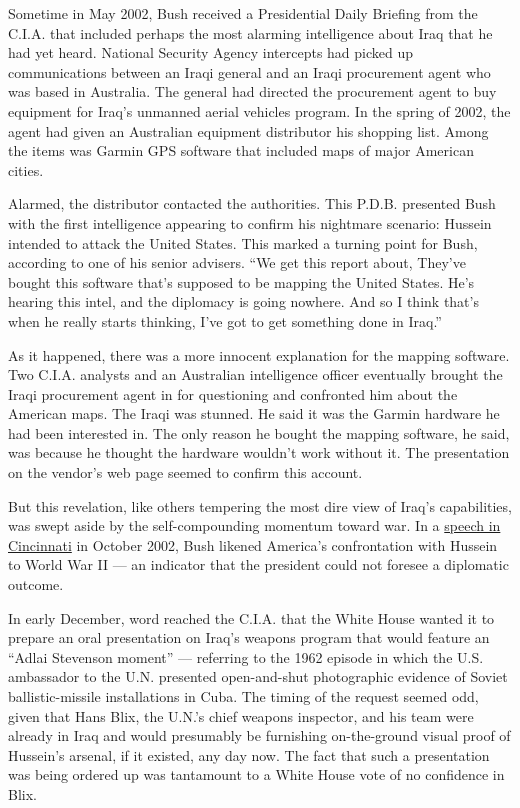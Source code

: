 Sometime in May 2002, Bush received a Presidential Daily Briefing from
the C.I.A. that included perhaps the most alarming intelligence about
Iraq that he had yet heard. National Security Agency intercepts had
picked up communications between an Iraqi general and an Iraqi
procurement agent who was based in Australia. The general had directed
the procurement agent to buy equipment for Iraq's unmanned aerial
vehicles program. In the spring of 2002, the agent had given an
Australian equipment distributor his shopping list. Among the items was
Garmin GPS software that included maps of major American cities.

Alarmed, the distributor contacted the authorities. This P.D.B.
presented Bush with the first intelligence appearing to confirm his
nightmare scenario: Hussein intended to attack the United States. This
marked a turning point for Bush, according to one of his senior
advisers. ``We get this report about, They've bought this software
that's supposed to be mapping the United States. He's hearing this
intel, and the diplomacy is going nowhere. And so I think that's when he
really starts thinking, I've got to get something done in Iraq.''

As it happened, there was a more innocent explanation for the mapping
software. Two C.I.A. analysts and an Australian intelligence officer
eventually brought the Iraqi procurement agent in for questioning and
confronted him about the American maps. The Iraqi was stunned. He said
it was the Garmin hardware he had been interested in. The only reason he
bought the mapping software, he said, was because he thought the
hardware wouldn't work without it. The presentation on the vendor's web
page seemed to confirm this account.

But this revelation, like others tempering the most dire view of Iraq's
capabilities, was swept aside by the self-compounding momentum toward
war. In a
\href{https://www.nytimes.com/2002/10/08/us/threats-responses-president-s-speech-bush-sees-urgent-duty-pre-empt-attack-iraq.html}{speech
in Cincinnati} in October 2002, Bush likened America's confrontation
with Hussein to World War II --- an indicator that the president could
not foresee a diplomatic outcome.

In early December, word reached the C.I.A. that the White House wanted
it to prepare an oral presentation on Iraq's weapons program that would
feature an ``Adlai Stevenson moment'' --- referring to the 1962 episode
in which the U.S. ambassador to the U.N. presented open-and-shut
photographic evidence of Soviet ballistic-missile installations in Cuba.
The timing of the request seemed odd, given that Hans Blix, the U.N.'s
chief weapons inspector, and his team were already in Iraq and would
presumably be furnishing on-the-ground visual proof of Hussein's
arsenal, if it existed, any day now. The fact that such a presentation
was being ordered up was tantamount to a White House vote of no
confidence in Blix.

